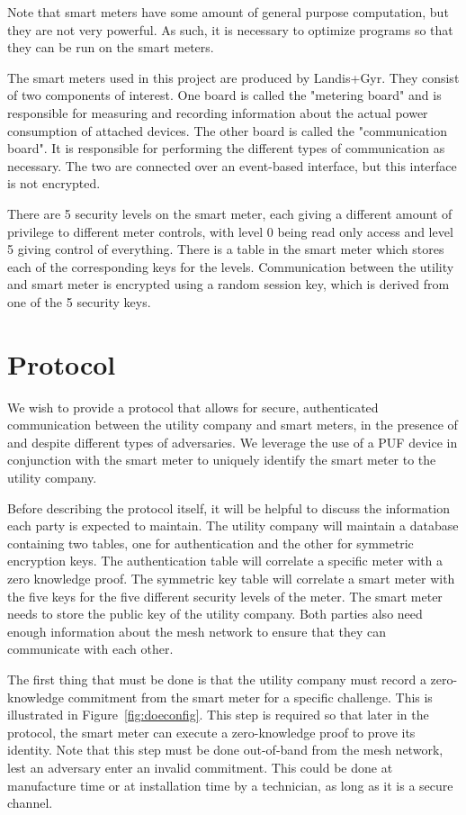 Note that smart meters have some amount of general purpose computation, but they are not very powerful. As such,
it is necessary to optimize programs so that they can be run on the smart meters.

The smart meters used in this project are produced by Landis+Gyr. They consist of two components of interest. One
board is called the "metering board" and is responsible for measuring and recording information about the actual
power consumption of attached devices. The other board is called the "communication board". It is responsible for
performing the different types of communication as necessary. The two are connected over an event-based interface,
but this interface is not encrypted. 

There are 5 security levels on the smart meter, each giving a different amount of privilege to different meter controls,
with level 0 being read only access and level 5 giving control of everything. There is a table in the smart meter which
stores each of the corresponding keys for the levels. Communication between the utility and smart meter is encrypted
using a random session key, which is derived from one of the 5 security keys.

\section{Protocol}
We wish to provide a protocol that allows for secure, authenticated communication between the utility company and
smart meters, in the presence of and despite different types of adversaries.
We leverage the use of a PUF device in conjunction with the smart meter to uniquely identify the smart meter to the
utility company.

Before describing the protocol itself, it will be helpful to discuss the information each party is expected to maintain.
The utility company will maintain a database containing two tables, one for authentication and the other for 
symmetric encryption keys. The authentication table will correlate a specific meter with a zero knowledge proof.
The symmetric key table will correlate a smart meter with the five keys for the five different security levels of the meter.
The smart meter needs to store the public key of the utility company. Both parties also need enough information about
the mesh network to ensure that they can communicate with each other.

The first thing that must be done is that the utility company must record a zero-knowledge commitment from the 
smart meter for a specific challenge. This is illustrated in Figure~\ref{fig:doeconfig}. This step is required so that later
in the protocol, the smart meter can execute a zero-knowledge proof to prove its identity.
Note that this step must be done out-of-band from the mesh network, lest an adversary enter an invalid commitment.
This could be done at manufacture time or at installation time by a technician, as long as it is a secure channel.

